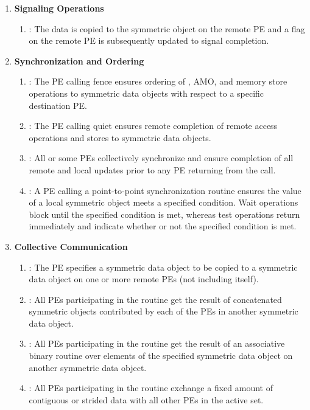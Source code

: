 \begin{enumerate}
\item \textbf{Signaling Operations}
\begin{enumerate}
  \item {}: The \source{} data is copied to the symmetric
        object on the remote \ac{PE} and a flag on the remote \ac{PE} is subsequently
        updated to signal completion.
\end{enumerate}

\item \textbf{Synchronization and Ordering}
\begin{enumerate}
  \item {}: The \ac{PE} calling fence ensures ordering of
  \PUT, \ac{AMO}, and memory store operations
  to symmetric data objects with respect to a specific
      destination \ac{PE}.
  \item {}: The \ac{PE} calling quiet ensures remote completion of remote access
      operations and stores to symmetric data objects.
  \item {}: All or some \acp{PE} collectively synchronize and ensure
      completion of all remote and local updates prior to any \ac{PE} returning
      from the call.
  \item {}: A \ac{PE} calling a point-to-point synchronization
      routine ensures the value of a local symmetric object meets a specified
      condition.  Wait operations block until the specified condition is
      met, whereas test operations return immediately and indicate whether or
      not the specified condition is met.
\end{enumerate}

\item \textbf{Collective Communication}
\begin{enumerate}
  \item {}: The  \ac{PE} specifies a symmetric data
      object to be copied to a symmetric data object on one or more remote
      \acp{PE} (not including itself).
  \item {}: All \acp{PE} participating in the routine get the result
      of concatenated symmetric objects contributed by each of the \acp{PE} in
      another symmetric data object.
  \item {}: All \acp{PE} participating in the routine get the result
      of an associative binary routine over elements of the specified symmetric
      data object on another symmetric data object.
  \item {}: All \acp{PE} participating in the routine exchange
      a fixed amount of contiguous or strided data with all other \acp{PE}
      in the active set.
\end{enumerate}


\end{enumerate}
